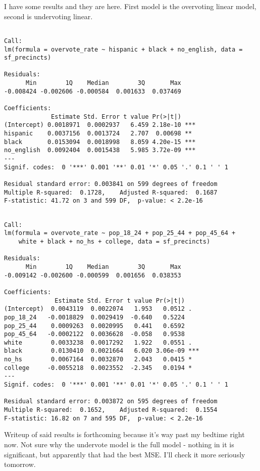 \documentclass[12pt,twoside]{reedthesis}
\theoremstyle{definition}
\theoremstyle{definition}
\theoremstyle{definition}
\theoremstyle{remark}
\begin{document}
I have some results and they are here. First model is the overvoting
linear model, second is undervoting linear.
\begin{verbatim}

Call:
lm(formula = overvote_rate ~ hispanic + black + no_english, data = sf_precincts)

Residuals:
      Min        1Q    Median        3Q       Max 
-0.008424 -0.002606 -0.000584  0.001633  0.037469 

Coefficients:
             Estimate Std. Error t value Pr(>|t|)    
(Intercept) 0.0018971  0.0002937   6.459 2.18e-10 ***
hispanic    0.0037156  0.0013724   2.707  0.00698 ** 
black       0.0153094  0.0018998   8.059 4.20e-15 ***
no_english  0.0092404  0.0015438   5.985 3.72e-09 ***
---
Signif. codes:  0 '***' 0.001 '**' 0.01 '*' 0.05 '.' 0.1 ' ' 1

Residual standard error: 0.003841 on 599 degrees of freedom
Multiple R-squared:  0.1728,    Adjusted R-squared:  0.1687 
F-statistic: 41.72 on 3 and 599 DF,  p-value: < 2.2e-16
\end{verbatim}
\begin{verbatim}

Call:
lm(formula = overvote_rate ~ pop_18_24 + pop_25_44 + pop_45_64 + 
    white + black + no_hs + college, data = sf_precincts)

Residuals:
      Min        1Q    Median        3Q       Max 
-0.009142 -0.002600 -0.000599  0.001656  0.038353 

Coefficients:
              Estimate Std. Error t value Pr(>|t|)    
(Intercept)  0.0043119  0.0022074   1.953   0.0512 .  
pop_18_24   -0.0018829  0.0029419  -0.640   0.5224    
pop_25_44    0.0009263  0.0020995   0.441   0.6592    
pop_45_64   -0.0002122  0.0036628  -0.058   0.9538    
white        0.0033238  0.0017292   1.922   0.0551 .  
black        0.0130410  0.0021664   6.020 3.06e-09 ***
no_hs        0.0067164  0.0032870   2.043   0.0415 *  
college     -0.0055218  0.0023552  -2.345   0.0194 *  
---
Signif. codes:  0 '***' 0.001 '**' 0.01 '*' 0.05 '.' 0.1 ' ' 1

Residual standard error: 0.003872 on 595 degrees of freedom
Multiple R-squared:  0.1652,    Adjusted R-squared:  0.1554 
F-statistic: 16.82 on 7 and 595 DF,  p-value: < 2.2e-16
\end{verbatim}
Writeup of said results is forthcoming because it's way past my bedtime
right now. Not sure why the undervote model is the full model - nothing
in it is significant, but apparently that had the best MSE. I'll check
it more seriously tomorrow.
\end{document}

